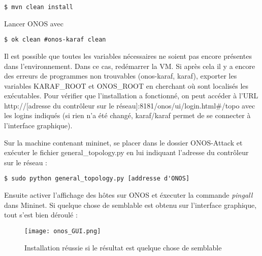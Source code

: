 \begin{verbatim}
$ mvn clean install
\end{verbatim}

Lancer ONOS avec
\begin{verbatim}
$ ok clean #onos-karaf clean
\end{verbatim}

Il est possible que toutes les variables nécessaires ne soient pas encore présentes dans l'environnement. Dans ce cas, redémarrer la VM. Si après cela il y a encore des erreurs de programmes non trouvables (onos-karaf, karaf), exporter les variables KARAF\_ROOT et ONOS\_ROOT en cherchant où sont localisés les exécutables.
Pour vérifier que l'installation a fonctionné, on peut accéder à l'URL http://[adresse du contrôleur sur le réseau]:8181/onos/ui/login.html\#/topo avec les logins indiqués (si rien n'a été changé, karaf/karaf permet de se connecter à l'interface graphique).

Sur la machine contenant mininet, se placer dans le dossier ONOS-Attack et exécuter le fichier general\_topology.py en lui indiquant l'adresse du contrôleur sur le réseau :
\begin{verbatim}
$ sudo python general_topology.py [addresse d'ONOS]
\end{verbatim}

Ensuite activer l'affichage des hôtes sur ONOS et éxecuter la commande \textit{pingall} dans Mininet. Si quelque chose de semblable est obtenu sur l'interface graphique, tout s'est bien déroulé :
\begin{figure}[h]
  	\centering
  	\texttt{[image: onos\_GUI.png]}
  	\caption{Installation réussie si le résultat est quelque chose de semblable}
\end{figure}